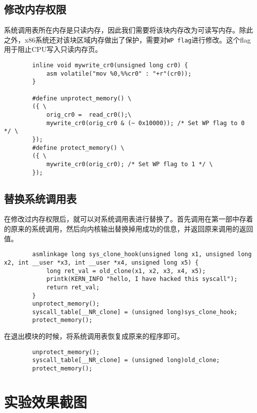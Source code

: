 \documentclass[UTF8]{ctexrep}
\begin{document}
    \subsection{修改内存权限}

    系统调用表所在内存是只读内存，因此我们需要将该块内存改为可读写内存。除此之外，x86系统还对该块区域内存做出了保护，需要对\texttt{WP flag}进行修改。这个flag用于阻止CPU写入只读内存页。

    \begin{lstlisting}
        inline void mywrite_cr0(unsigned long cr0) {
            asm volatile("mov %0,%%cr0" : "+r"(cr0));
        }

        #define unprotect_memory() \
        ({ \
            orig_cr0 =  read_cr0();\
            mywrite_cr0(orig_cr0 & (~ 0x10000)); /* Set WP flag to 0 */ \
        });
        #define protect_memory() \
        ({ \
            mywrite_cr0(orig_cr0); /* Set WP flag to 1 */ \
        });\end{lstlisting}

    \subsection{替换系统调用表}
    在修改过内存权限后，就可以对系统调用表进行替换了。首先调用在第一部中存着的原来的系统调用，然后向内核输出替换掉用成功的信息，并返回原来调用的返回值。
    
    \begin{lstlisting}
        asmlinkage long sys_clone_hook(unsigned long x1, unsigned long x2, int __user *x3, int __user *x4, unsigned long x5) {
            long ret_val = old_clone(x1, x2, x3, x4, x5);
            printk(KERN_INFO "hello, I have hacked this syscall");
            return ret_val;
        }
        unprotect_memory();
        syscall_table[__NR_clone] = (unsigned long)sys_clone_hook;
        protect_memory();\end{lstlisting}

    在退出模块的时候，将系统调用表恢复成原来的程序即可。

    \begin{lstlisting}
        unprotect_memory();
        syscall_table[__NR_clone] = (unsigned long)old_clone;
        protect_memory();\end{lstlisting}

    \section{实验效果截图}
    
\end{document}
